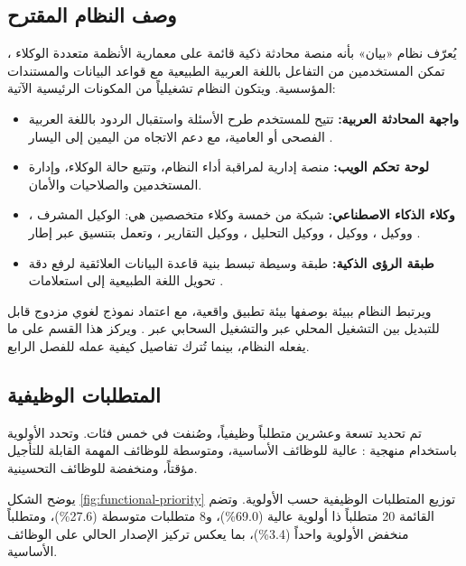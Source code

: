 \subsection{وصف النظام المقترح}
\label{subsec:proposed-system-description}

يُعرّف نظام «بيان» بأنه منصة محادثة ذكية قائمة على معمارية الأنظمة متعددة الوكلاء ، تمكن المستخدمين من التفاعل باللغة العربية الطبيعية مع قواعد البيانات والمستندات المؤسسية. ويتكون النظام تشغيلياً من المكونات الرئيسية الآتية:

\begin{itemize}[label=\textcolor{kauprimary}{$\blacktriangleright$},leftmargin=*]
  \item \textbf{واجهة المحادثة العربية:} تتيح للمستخدم طرح الأسئلة واستقبال الردود باللغة العربية الفصحى أو العامية، مع دعم الاتجاه من اليمين إلى اليسار .
  \item \textbf{لوحة تحكم الويب:} منصة إدارية لمراقبة أداء النظام، وتتبع حالة الوكلاء، وإدارة المستخدمين والصلاحيات والأمان.
  \item \textbf{وكلاء الذكاء الاصطناعي:} شبكة من خمسة وكلاء متخصصين هي: الوكيل المشرف ، ووكيل ، ووكيل ، ووكيل التحليل ، ووكيل التقارير ، وتعمل بتنسيق عبر إطار .
  \item \textbf{طبقة الرؤى الذكية:} طبقة وسيطة تبسط بنية قاعدة البيانات العلائقية لرفع دقة تحويل اللغة الطبيعية إلى استعلامات .
\end{itemize}

ويرتبط النظام ببيئة  بوصفها بيئة تطبيق واقعية، مع اعتماد نموذج لغوي مزدوج قابل للتبديل بين التشغيل المحلي عبر  والتشغيل السحابي عبر . ويركز هذا القسم على ما يفعله النظام، بينما تُترك تفاصيل كيفية عمله للفصل الرابع.

\subsection{المتطلبات الوظيفية}
\label{subsec:functional-reqs}

تم تحديد تسعة وعشرين متطلباً وظيفياً، وصُنفت في خمس فئات. وتحدد الأولوية باستخدام منهجية  \cite{clegg1994moscow}: عالية  للوظائف الأساسية، ومتوسطة  للوظائف المهمة القابلة للتأجيل مؤقتاً، ومنخفضة  للوظائف التحسينية.

يوضح الشكل \ref{fig:functional-priority} توزيع المتطلبات الوظيفية حسب الأولوية. وتضم القائمة 20 متطلباً ذا أولوية عالية (69.0\%)، و8 متطلبات متوسطة (27.6\%)، ومتطلباً منخفض الأولوية واحداً (3.4\%)، بما يعكس تركيز الإصدار الحالي على الوظائف الأساسية.

